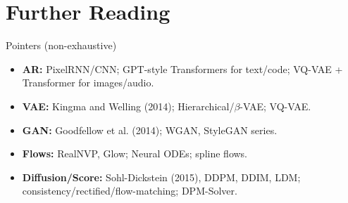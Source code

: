 \documentclass[aspectratio=169]{beamer}
\begin{document}
\section*{Further Reading}

\begin{frame}{Pointers (non-exhaustive)}
\small
\begin{itemize}
  \item \textbf{AR:} PixelRNN/CNN; GPT-style Transformers for text/code; VQ-VAE + Transformer for images/audio.
  \item \textbf{VAE:} Kingma and Welling (2014); Hierarchical/$\beta$-VAE; VQ-VAE.
  \item \textbf{GAN:} Goodfellow et al. (2014); WGAN, StyleGAN series.
  \item \textbf{Flows:} RealNVP, Glow; Neural ODEs; spline flows.
  \item \textbf{Diffusion/Score:} Sohl-Dickstein (2015), DDPM, DDIM, LDM; consistency/rectified/flow-matching; DPM-Solver.
\end{itemize}
\end{frame}
\end{document}
